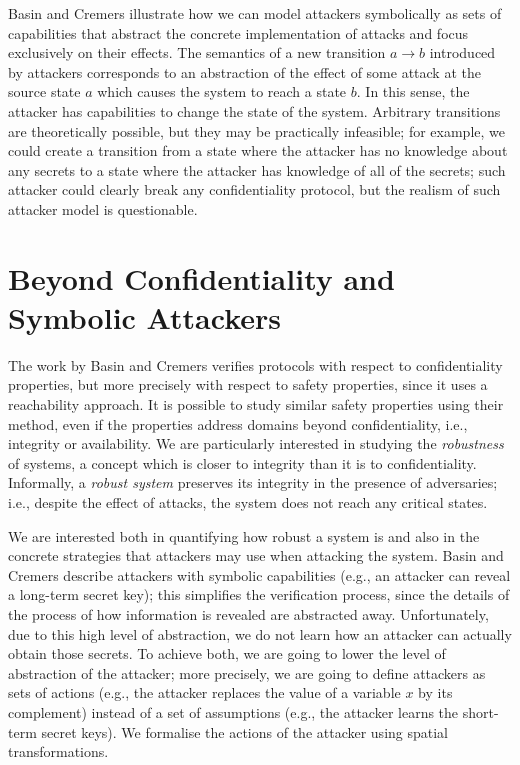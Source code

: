 Basin and Cremers illustrate how we can model attackers symbolically as sets of capabilities that abstract the concrete implementation of attacks and focus exclusively on their effects. The semantics of a new transition $a\rightarrow b$ introduced by attackers corresponds to an abstraction of the effect of some attack at the source state $a$ which causes the system to reach a state $b$. In this sense, the attacker has capabilities to change the state of the system. Arbitrary transitions are theoretically possible, but they may be practically infeasible; for example, we could create a transition from a state where the attacker has no knowledge about any secrets to a state where the attacker has knowledge of all of the secrets; such attacker could clearly break any confidentiality protocol, but the realism of such attacker model is questionable. 

\section{Beyond Confidentiality and Symbolic Attackers}
The work by Basin and Cremers verifies protocols with respect to confidentiality properties, but more precisely with respect to safety properties, since it uses a reachability approach. It is possible to study similar safety properties using their method, even if the properties address domains beyond confidentiality, i.e., integrity or availability. We are particularly interested in studying the \emph{robustness} of systems, a concept which is closer to integrity than it is to confidentiality. 
Informally, a \emph{robust system} preserves its integrity in the presence of adversaries; i.e., despite the effect of attacks, the system does not reach any critical states. %

We are interested both in quantifying how robust a system is and also in the concrete strategies that attackers may use when attacking the system. Basin and Cremers describe attackers with symbolic capabilities (e.g., an attacker can reveal a long-term secret key); this simplifies the verification process, since the details of the process of how information is revealed are abstracted away. Unfortunately, due to this high level of abstraction, we do not learn how an attacker can actually obtain those secrets.  To achieve both, we are going to lower the level of abstraction of the attacker; more precisely, we are going to define attackers as sets of actions (e.g., the attacker replaces the value of a variable $x$ by its complement) instead of a set of assumptions (e.g., the attacker learns the short-term secret keys). We formalise the actions of the attacker using {spatial transformations}.%

